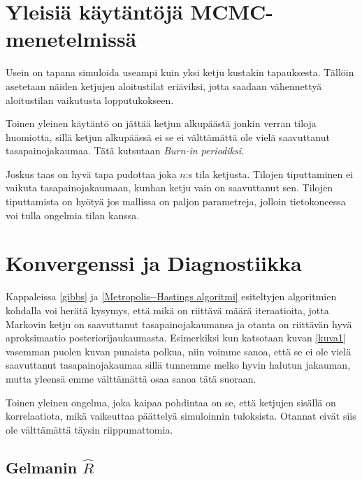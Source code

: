 \section{Yleisiä käytäntöjä MCMC-menetelmissä}

Usein on tapana simuloida useampi kuin yksi ketju kustakin tapauksesta. Tällöin asetetaan näiden ketjujen aloitustilat eriäviksi, jotta saadaan vähennettyä aloitustilan vaikutusta lopputukokseen.

Toinen yleinen käytäntö on jättää ketjun alkupäästä jonkin verran tiloja huomiotta, sillä ketjun alkupäässä ei se ei välttämättä ole vielä saavuttanut tasapainojakaumaa. Tätä kutsutaan \textit{Burn-in periodiksi}.

Joskus taas on hyvä tapa pudottaa joka $n$:s tila ketjusta. Tilojen tiputtaminen ei vaikuta tasapainojakaumaan, kunhan ketju vain on saavuttanut sen. Tilojen tiputtamista on hyötyä jos mallissa on paljon parametreja, jolloin tietokoneessa voi tulla ongelmia tilan kanssa.

\section{Konvergenssi ja Diagnostiikka}

Kappaleissa \ref{gibbs} ja \ref{Metropolis--Hastings algoritmi} esiteltyjen algoritmien kohdalla voi herätä kysymys, että mikä on riittävä määrä iteraatioita, jotta Markovin ketju on saavuttanut tasapainojakaumansa ja otanta on riittävän hyvä aproksimaatio posteriorijaukaumasta. Esimerkiksi kun katsotaan kuvan \ref{kuva1} vasemman puolen kuvan punaista polkua, niin voimme sanoa, että se ei ole vielä saavuttanut tasapainojakaumaa sillä tunnemme melko hyvin halutun jakauman, mutta yleensä emme välttämättä osaa sanoa tätä suoraan. 

Toinen yleinen ongelma, joka kaipaa pohdintaa on se, että ketjujen sisällä on korrelaatiota, mikä vaikeuttaa päättelyä simuloinnin tuloksista. Otannat eivät siis ole välttämättä täysin riippumattomia.

\subsection{Gelmanin $\hat{R}$}

